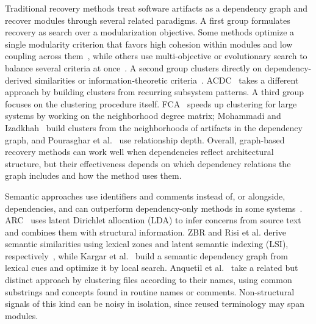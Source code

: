 Traditional recovery methods treat software artifacts as a dependency graph and recover modules through several related paradigms. A first group formulates recovery as search over a modularization objective. Some methods optimize a single modularity criterion that favors high cohesion within modules and low coupling across them~\cite{bunch_sahc_nahc,dagc}, while others use multi-objective or evolutionary search to balance several criteria at once~\cite{mca_eca}. A second group clusters directly on dependency-derived similarities or information-theoretic criteria~\cite{cct,hcc_2019,limbo,wca}. ACDC~\cite{acdc} takes a different approach by building clusters from recurring subsystem patterns. A third group focuses on the clustering procedure itself. FCA~\cite{fca} speeds up clustering for large systems by working on the neighborhood degree matrix; Mohammadi and Izadkhah~\cite{neighborhood_tree_2019} build clusters from the neighborhoods of artifacts in the dependency graph, and Pourasghar et al.~\cite{gma_2021} use relationship depth. Overall, graph-based recovery methods can work well when dependencies reflect architectural structure, but their effectiveness depends on which dependency relations the graph includes and how the method uses them.

Semantic approaches use identifiers and comments instead of, or alongside, dependencies, and can outperform dependency-only methods in some systems~\cite{comparative_survey}. ARC~\cite{arc} uses latent Dirichlet allocation (LDA) to infer concerns from source text and combines them with structural information. ZBR and Risi et al. derive semantic similarities using lexical zones and latent semantic indexing (LSI), respectively~\cite{zbr,risi2012fold}, while Kargar et al.~\cite{kargar2017semantic} build a semantic dependency graph from lexical cues and optimize it by local search. Anquetil et al.~\cite{file_clustering} take a related but distinct approach by clustering files according to their names, using common substrings and concepts found in routine names or comments. Non-structural signals of this kind can be noisy in isolation, since reused terminology may span modules.


